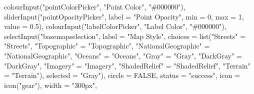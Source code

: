 \documentclass[
]{article}
\newenvironment{Shaded}{\begin{snugshade}}{\end{snugshade}}
\newcommand{\AttributeTok}[1]{\textcolor[rgb]{0.77,0.63,0.00}{#1}}
\newcommand{\ConstantTok}[1]{\textcolor[rgb]{0.00,0.00,0.00}{#1}}
\newcommand{\DecValTok}[1]{\textcolor[rgb]{0.00,0.00,0.81}{#1}}
\newcommand{\FloatTok}[1]{\textcolor[rgb]{0.00,0.00,0.81}{#1}}
\newcommand{\FunctionTok}[1]{\textcolor[rgb]{0.00,0.00,0.00}{#1}}
\newcommand{\NormalTok}[1]{#1}
\newcommand{\OtherTok}[1]{\textcolor[rgb]{0.56,0.35,0.01}{#1}}
\newcommand{\StringTok}[1]{\textcolor[rgb]{0.31,0.60,0.02}{#1}}
\begin{document}
\begin{Shaded}
\begin{Highlighting}[]
                            \FunctionTok{colourInput}\NormalTok{(}\StringTok{"pointColorPicker"}\NormalTok{, }\StringTok{"Point Color"}\NormalTok{, }\StringTok{"\#000000"}\NormalTok{),}
                            \FunctionTok{sliderInput}\NormalTok{(}\StringTok{"pointOpacityPicker"}\NormalTok{,}
                                        \AttributeTok{label =} \StringTok{"Point Opacity"}\NormalTok{,}
                                        \AttributeTok{min =} \DecValTok{0}\NormalTok{, }\AttributeTok{max =} \DecValTok{1}\NormalTok{, }\AttributeTok{value =} \FloatTok{0.5}\NormalTok{),}
                            \FunctionTok{colourInput}\NormalTok{(}\StringTok{"labelColorPicker"}\NormalTok{, }\StringTok{"Label Color"}\NormalTok{, }\StringTok{"\#000000"}\NormalTok{),}
                            \FunctionTok{selectInput}\NormalTok{(}\StringTok{"basemapselection"}\NormalTok{,}
                                         \AttributeTok{label =} \StringTok{"Map Style"}\NormalTok{,}
                                         \AttributeTok{choices =} \FunctionTok{list}\NormalTok{(}\StringTok{"Streets"} \OtherTok{=} \StringTok{"Streets"}\NormalTok{,}
                                                        \StringTok{"Topographic"} \OtherTok{=} \StringTok{"Topographic"}\NormalTok{,}
                                                        \StringTok{"NationalGeographic"} \OtherTok{=} \StringTok{"NationalGeographic"}\NormalTok{,}
                                                        \StringTok{"Oceans"} \OtherTok{=} \StringTok{"Oceans"}\NormalTok{,}
                                                        \StringTok{"Gray"} \OtherTok{=} \StringTok{"Gray"}\NormalTok{,}
                                                        \StringTok{"DarkGray"} \OtherTok{=} \StringTok{"DarkGray"}\NormalTok{,}
                                                        \StringTok{"Imagery"} \OtherTok{=} \StringTok{"Imagery"}\NormalTok{,}
                                                        \StringTok{"ShadedRelief"} \OtherTok{=} \StringTok{"ShadedRelief"}\NormalTok{,}
                                                        \StringTok{"Terrain"} \OtherTok{=} \StringTok{"Terrain"}\NormalTok{),}
                                         \AttributeTok{selected =} \StringTok{"Gray"}\NormalTok{),}
                            \AttributeTok{circle =} \ConstantTok{FALSE}\NormalTok{,}
                            \AttributeTok{status =} \StringTok{"success"}\NormalTok{,}
                            \AttributeTok{icon =} \FunctionTok{icon}\NormalTok{(}\StringTok{"gear"}\NormalTok{),}
                            \AttributeTok{width =} \StringTok{"300px"}\NormalTok{,}

\end{Highlighting}
\end{Shaded}
\end{document}
